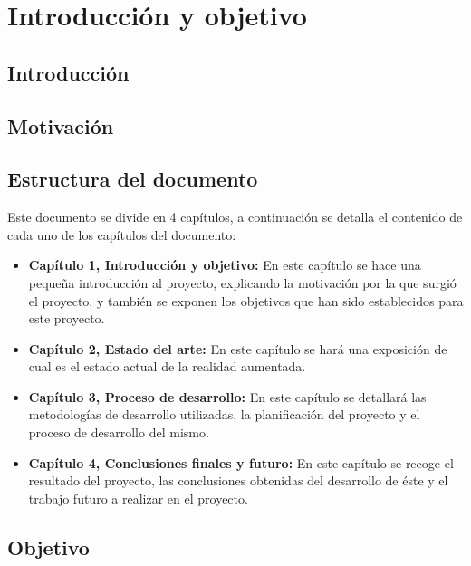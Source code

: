 \chapter{Introducción y objetivo}
\label{ch:introduccion}

\section{Introducción}

\section{Motivación}

\section{Estructura del documento}
Este documento se divide en 4 capítulos, a continuación se detalla el contenido de cada uno de los capítulos del documento:
\begin{itemize}
  \item \textbf{Capítulo 1, Introducción y objetivo:} En este capítulo se hace una pequeña introducción al proyecto, explicando la motivación por la que surgió el proyecto, y también se exponen los objetivos que han sido establecidos para este proyecto.
  \item \textbf{Capítulo 2, Estado del arte:} En este capítulo se hará una exposición de cual es el estado actual de la realidad aumentada.
  \item \textbf{Capítulo 3, Proceso de desarrollo:} En este capítulo se detallará las metodologías de desarrollo utilizadas, la planificación del proyecto y el proceso de desarrollo del mismo.
  \item \textbf{Capítulo 4, Conclusiones finales y futuro:} En este capítulo se recoge el resultado del proyecto, las conclusiones obtenidas del desarrollo de éste y el trabajo futuro a realizar en el proyecto.
\end{itemize}

\section{Objetivo}
